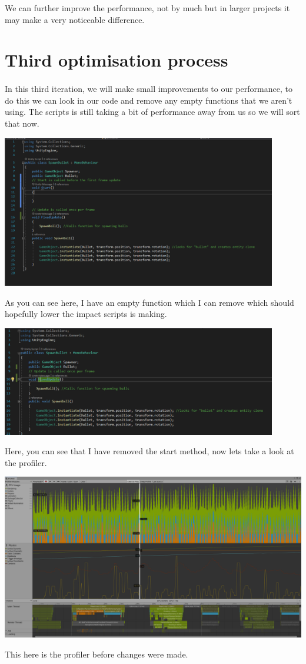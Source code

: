 \documentclass{article}
\begin{document}
We can further improve the performance, not by much but in larger projects it may make a very noticeable difference.

\newpage
\section{Third optimisation process}
\paragraph{}
In this third iteration, we will make small improvements to our performance, to do this we can look in our code and remove any empty functions that we aren't using. The scripts is still taking a bit of performance away from us so we will sort that now.

\includegraphics[width=12cm]{images/code4.png}\par
As you can see here, I have an empty function which I can remove which should hopefully lower the impact scripts is making.

\includegraphics[width=12cm]{images/code5.png}\par
Here, you can see that I have removed the start method, now lets take a look at the profiler.

\includegraphics[width=15cm]{images/profiler4.png}\par
This here is the profiler before changes were made.
\end{document}
